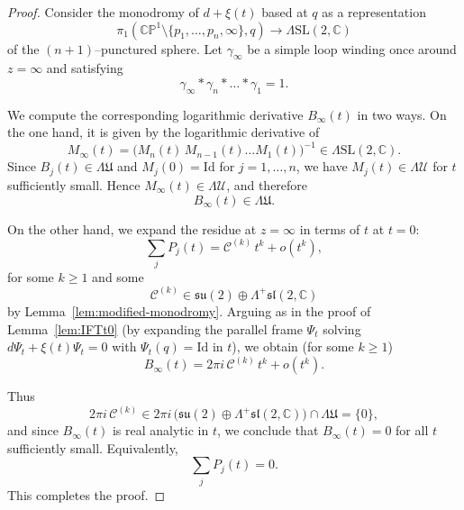 \documentclass[10pt,a4paper]{amsart}
\newcommand{\C}{\mathbb C}
\newcommand{\CP}{\mathbb{CP}}
\begin{document}
\begin{proof}
Consider the monodromy of $d+\xi(t)$ based at $q$ as a representation
\[
\pi_1(\CP^1\setminus\{p_1,\dots,p_n,\infty\},q)\to\Lambda\mathrm{SL}(2,\C)
\]
of the $(n+1)$--punctured sphere.
Let $\gamma_\infty$ be a simple loop winding once around $z=\infty$ and satisfying
\[
\gamma_\infty * \gamma_n * \dots * \gamma_1 = 1.
\]

We compute the corresponding logarithmic derivative $B_\infty(t)$ in two ways.
On the one hand, it is given by the logarithmic derivative of
\[
M_\infty(t)
=
\bigl(M_n(t)\, M_{n-1}(t)\dots M_1(t)\bigr)^{-1}
\in
\Lambda\mathrm{SL}(2,\C).
\]
Since $B_j(t)\in\Lambda\mathfrak U$ and $M_j(0)=\mathrm{Id}$ for $j=1,\dots,n$,
we have $M_j(t)\in\Lambda\mathcal U$ for $t$ sufficiently small.
Hence $M_\infty(t)\in\Lambda\mathcal U$, and therefore
\[
B_\infty(t)\in\Lambda\mathfrak U.
\]

On the other hand, we expand the residue at $z=\infty$ in terms of $t$ at $t=0$:
\[
\sum_j P_j(t)= \mathcal C^{(k)}\, t^{k}+o(t^{k}),
\]
for some $k\geq1$ and some
\[
\mathcal C^{(k)}\in \mathfrak{su}(2)\oplus \Lambda^{+}\mathfrak{sl}(2,\C)
\]
by Lemma~\ref{lem:modified-monodromy}.
Arguing as in the proof of Lemma~\ref{lem:IFTt0}
(by expanding the parallel frame $\Psi_t$ solving
$d\Psi_t+\xi(t)\Psi_t=0$ with $\Psi_t(q)=\mathrm{Id}$ in $t$),
we obtain (for some $k\geq1$)
\[
B_\infty(t)=2\pi i\, \mathcal C^{(k)}\, t^{k}+o(t^{k}).
\]

Thus
\[
2\pi i\, \mathcal C^{(k)}\in 2\pi i\,
\bigl(\mathfrak{su}(2)\oplus \Lambda^{+}\mathfrak{sl}(2,\C)\bigr)
\cap \Lambda\mathfrak U
=
\{0\},
\]
and since $B_\infty(t)$ is real analytic in $t$, we conclude that
$B_\infty(t)=0$ for all $t$ sufficiently small.
Equivalently,
\[
\sum_j P_j(t)=0.
\]
This completes the proof.
\end{proof}
\end{document}
